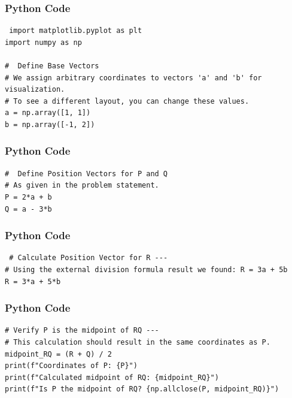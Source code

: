 \documentclass{beamer}
\begin{document}
\begin{frame}[fragile]
    \frametitle{Python Code}
    \begin{lstlisting}
 import matplotlib.pyplot as plt
import numpy as np

#  Define Base Vectors
# We assign arbitrary coordinates to vectors 'a' and 'b' for visualization.
# To see a different layout, you can change these values.
a = np.array([1, 1])
b = np.array([-1, 2])

\end{lstlisting}
\end{frame}

\begin{frame}[fragile]
    \frametitle{Python Code}

    \begin{lstlisting}
#  Define Position Vectors for P and Q
# As given in the problem statement.
P = 2*a + b
Q = a - 3*b

    \end{lstlisting}
\end{frame}

\begin{frame}[fragile]
    \frametitle{Python Code}

    \begin{lstlisting}
 # Calculate Position Vector for R ---
# Using the external division formula result we found: R = 3a + 5b
R = 3*a + 5*b
    \end{lstlisting}
\end{frame}

\begin{frame}[fragile]
    \frametitle{Python Code}

    \begin{lstlisting}
# Verify P is the midpoint of RQ ---
# This calculation should result in the same coordinates as P.
midpoint_RQ = (R + Q) / 2
print(f"Coordinates of P: {P}")
print(f"Calculated midpoint of RQ: {midpoint_RQ}")
print(f"Is P the midpoint of RQ? {np.allclose(P, midpoint_RQ)}")

\end{lstlisting}
\end{frame}
\end{document}
